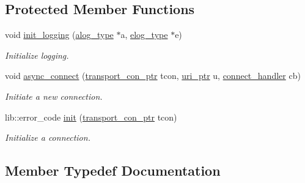 \subsection*{Protected Member Functions}
\begin{DoxyCompactItemize}
\item 
void \mbox{\hyperlink{classwebsocketpp_1_1transport_1_1stub_1_1endpoint_ad64a58ebd03fe9e55d19ec8d27bcaac9}{init\+\_\+logging}} (\mbox{\hyperlink{classwebsocketpp_1_1transport_1_1stub_1_1endpoint_aa62a4dd626d9b8757972c0ef66e72419}{alog\+\_\+type}} $\ast$a, \mbox{\hyperlink{classwebsocketpp_1_1transport_1_1stub_1_1endpoint_a7890584ddff40571589f62c52bc5b080}{elog\+\_\+type}} $\ast$e)
\begin{DoxyCompactList}\small\item\em Initialize logging. \end{DoxyCompactList}\item 
void \mbox{\hyperlink{classwebsocketpp_1_1transport_1_1stub_1_1endpoint_ad912ae8113d6c879fab22daaeba964b9}{async\+\_\+connect}} (\mbox{\hyperlink{classwebsocketpp_1_1transport_1_1stub_1_1endpoint_af2bad83f2577d578712642e11767efe1}{transport\+\_\+con\+\_\+ptr}} tcon, \mbox{\hyperlink{namespacewebsocketpp_aae370ea5ac83a8ece7712cb39fc23f5b}{uri\+\_\+ptr}} u, \mbox{\hyperlink{namespacewebsocketpp_1_1transport_ac392fca34e946b48414278c0c3addfa5}{connect\+\_\+handler}} cb)
\begin{DoxyCompactList}\small\item\em Initiate a new connection. \end{DoxyCompactList}\item 
lib\+::error\+\_\+code \mbox{\hyperlink{classwebsocketpp_1_1transport_1_1stub_1_1endpoint_a9931019b90c1e7b162d9fb7d39d5b3a2}{init}} (\mbox{\hyperlink{classwebsocketpp_1_1transport_1_1stub_1_1endpoint_af2bad83f2577d578712642e11767efe1}{transport\+\_\+con\+\_\+ptr}} tcon)
\begin{DoxyCompactList}\small\item\em Initialize a connection. \end{DoxyCompactList}\end{DoxyCompactItemize}


\subsection{Member Typedef Documentation}
\mbox{\label{classwebsocketpp_1_1transport_1_1stub_1_1endpoint_af2bad83f2577d578712642e11767efe1}} 
